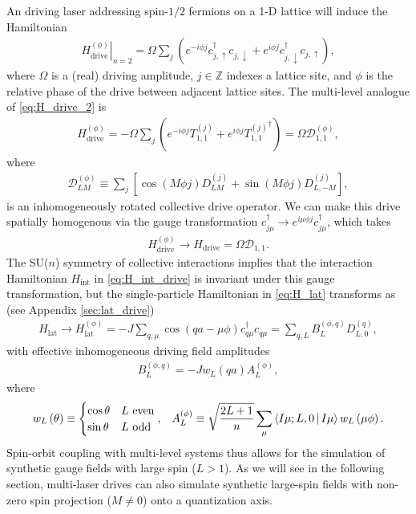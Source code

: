 \documentclass[nofootinbib,notitlepage,11pt]{revtex4-2}
\renewcommand{\t}{\text} %
\newcommand{\f}[2]{\dfrac{#1}{#2}} %
\newcommand{\p}[1]{\left(#1\right)} %
\renewcommand{\sp}[1]{\left[#1\right]} %
\newcommand{\bk}{\Braket} %
\newcommand{\1}{\mathds{1}}
\newcommand{\up}{\uparrow}
\newcommand{\dn}{\downarrow}
\newcommand{\D}{\mathcal{D}}
\begin{document}
An driving laser addressing spin-$1/2$ fermions on a 1-D lattice will
induce the Hamiltonian
\begin{align}
  \left. H_{\t{drive}}^{(\phi)} \right|_{n=2}
  = \Omega \sum_j
  \p{e^{-i\phi j} c_{j,\up}^\dag c_{j,\dn}
    + e^{i\phi j} c_{j,\dn}^\dag c_{j,\up}},
  \label{eq:H_drive_2}
\end{align}
where $\Omega$ is a (real) driving amplitude, $j\in\mathbb{Z}$ indexes
a lattice site, and $\phi$ is the relative phase of the drive between
adjacent lattice sites.  The multi-level analogue of
\eqref{eq:H_drive_2} is
\begin{align}
  H_{\t{drive}}^{(\phi)}
  = -\Omega \sum_j \p{e^{-i\phi j} T_{1,1}^{(j)}
    + e^{i\phi j} {T_{1,1}^{(j)}}^\dag}
  = \Omega \D_{1,1}^{(\phi)},
  \label{eq:H_drive}
\end{align}
where
\begin{align}
  \D_{LM}^{(\phi)}
  \equiv \sum_j \sp{\cos\p{M\phi j} D_{LM}^{(j)}
    + \sin\p{M\phi j} D_{L,-M}^{(j)}},
  \label{eq:drive_rot}
\end{align}
is an inhomogeneously rotated collective drive operator.  We can make
this drive spatially homogenous via the gauge transformation
$c_{j\mu}^\dag \to e^{i\mu\phi j} c_{j\mu}^\dag$, which takes
\begin{align}
  H_{\t{drive}}^{(\phi)} \to H_{\t{drive}} = \Omega \D_{1,1}.
\end{align}
The SU($n$) symmetry of collective interactions implies that the
interaction Hamiltonian $H_{\t{int}}$ in \eqref{eq:H_int_drive} is
invariant under this gauge transformation, but the single-particle
Hamiltonian in \eqref{eq:H_lat} transforms as (see Appendix
\ref{sec:lat_drive})
\begin{align}
  H_{\t{lat}}
  \to H_{\t{lat}}^{(\phi)}
  = -J \sum_{q,\mu} \cos\p{qa-\mu\phi} c_{q\mu}^\dag c_{q\mu}
  = \sum_{q,L} B_L^{(\phi,q)} D_{L,0}^{(q)},
  \label{eq:H_lat_SOC}
\end{align}
with effective inhomogeneous driving field amplitudes
\begin{align}
  B_L^{(\phi,q)} = -J w_L\p{qa} A_L^{(\phi)},
\end{align}
where
\begin{align}
  w_L\p{\theta} \equiv
  \begin{cases}
    \cos\theta & L~\t{even} \\
    \sin\theta & L~\t{odd}
  \end{cases},
  &&
  A_L^{(\phi)} \equiv \sqrt{\f{2L+1}{n}}
  \sum_\mu \bk{I\mu;L,0|I\mu} w_L\p{\mu\phi}.
\end{align}
Spin-orbit coupling with multi-level systems thus allows for the
simulation of synthetic gauge fields with large spin ($L>1$).  As we
will see in the following section, multi-laser drives can also
simulate synthetic large-spin fields with non-zero spin projection
($M\ne0$) onto a quantization axis.
\end{document}
